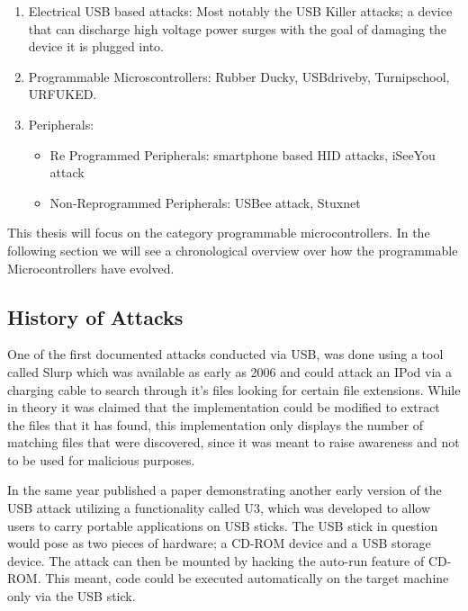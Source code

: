 \begin{enumerate}
  \item Electrical USB based attacks: Most notably the USB Killer attacks; a device that can discharge high voltage power surges with the goal of damaging the device it is plugged into. \cite{USBKillDevices}
  \item Programmable Microscontrollers: Rubber Ducky, USBdriveby, Turnipschool, URFUKED.
  \item Peripherals:
  \begin{itemize}
      \item Re Programmed Peripherals: smartphone based HID attacks, iSeeYou attack
      \item Non-Reprogrammed Peripherals: USBee attack, Stuxnet
  \end{itemize}
\end{enumerate}
	


This thesis will focus on the category programmable microcontrollers. In the following section we will see a chronological overview over how the programmable Microcontrollers have evolved.  

\subsection{History of Attacks} \label{HistoryOfAttacks}

One of the first documented attacks conducted via USB, was done using a tool called Slurp \cite{SharpIdeasDownloads2006} which was available as early as 2006 and could attack an IPod via a charging cable to search through it's files looking for certain file extensions. While in theory it was claimed that the implementation could be modified to extract the files that it has found, this implementation only displays the number of matching files that were discovered, since it was meant to raise awareness and not to be used for malicious purposes. 

In the same year \cite{al-zarouniRealityRisksConsented2006} published a paper demonstrating another early version of the USB attack utilizing a functionality called U3, which was developed to allow users to carry portable applications on USB sticks. The USB stick in question would pose as two pieces of hardware; a CD-ROM device and a USB storage device. The attack can then be mounted by hacking the auto-run feature of CD-ROM. This meant, code could be executed automatically on the target machine only via the USB stick. 

